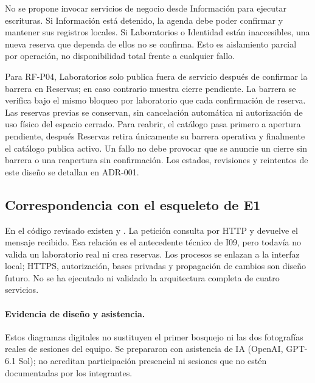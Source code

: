 No se propone invocar servicios de negocio desde Información para ejecutar
escrituras. Si Información está detenido, la agenda debe poder confirmar y
mantener sus registros locales. Si Laboratorios o Identidad están inaccesibles,
una nueva reserva que dependa de ellos no se confirma. Esto es aislamiento
parcial por operación, no disponibilidad total frente a cualquier fallo.

Para RF-P04, Laboratorios solo publica fuera de servicio después de confirmar
la barrera en Reservas; en caso contrario muestra cierre pendiente. La barrera
se verifica bajo el mismo bloqueo por laboratorio que cada confirmación de
reserva. Las reservas previas se conservan, sin cancelación automática ni
autorización de uso físico del espacio cerrado. Para reabrir, el catálogo pasa
primero a apertura pendiente, después Reservas retira únicamente su barrera
operativa y finalmente el catálogo publica activo. Un fallo no debe provocar
que se anuncie un cierre sin barrera o una reapertura sin confirmación.
Los estados, revisiones y reintentos de este diseño se detallan en ADR-001.

\subsection{Correspondencia con el esqueleto de E1}

En el código revisado existen  y
. La petición
 consulta
 por HTTP y devuelve el mensaje recibido.
Esa relación es el antecedente técnico de I09, pero todavía no valida un
laboratorio real ni crea reservas. Los procesos se enlazan a la interfaz local;
HTTPS, autorización, bases privadas y propagación de cambios son diseño futuro.
No se ha ejecutado ni validado la arquitectura completa de cuatro servicios.

\paragraph{Evidencia de diseño y asistencia.}
Estos diagramas digitales no sustituyen el primer bosquejo ni las dos
fotografías reales de sesiones del equipo. Se prepararon con asistencia de
IA (OpenAI, GPT-6.1 Sol); no acreditan participación presencial ni sesiones
que no estén documentadas por los integrantes.
